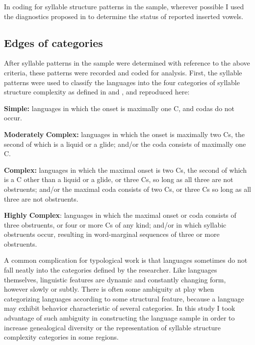   In coding for syllable structure patterns in the sample, wherever possible I used the diagnostics proposed in \citet{Hall2006} to determine the status of reported inserted vowels.

\subsection{Edges of categories}\label{sec:3.2.3}

  After syllable patterns in the sample were determined with reference to the above criteria, these patterns were recorded and coded for analysis. First, the syllable patterns were used to classify the languages into the four categories of syllable structure complexity as defined in \citet{Maddieson2013a} and , and reproduced here:

\textbf{Simple:} languages in which the onset is maximally one C, and codas do not occur.

\textbf{Moderately} \textbf{Complex:} languages in which the onset is maximally two Cs, the second of which is a liquid or a glide; and/or the coda consists of maximally one C.

\textbf{Complex:} languages in which the maximal onset is two Cs, the second of which is a C other than a liquid or a glide, or three Cs, so long as all three are not obstruents; and/or the maximal coda consists of two Cs, or three Cs so long as all three are not obstruents.

\textbf{Highly} \textbf{Complex}: languages in which the maximal onset or coda consists of three obstruents, or four or more Cs of any kind; and/or in which syllabic obstruents occur, resulting in word-marginal sequences of three or more obstruents.

  A common complication for typological work is that languages sometimes do not fall neatly into the categories defined by the researcher. Like languages themselves, linguistic features are dynamic and constantly changing form, however slowly or subtly. There is often some ambiguity at play when categorizing languages according to some structural feature, because a language may exhibit behavior characteristic of several categories. In this study I took advantage of such ambiguity in constructing the language sample in order to increase genealogical diversity or the representation of syllable structure complexity categories in some regions.

